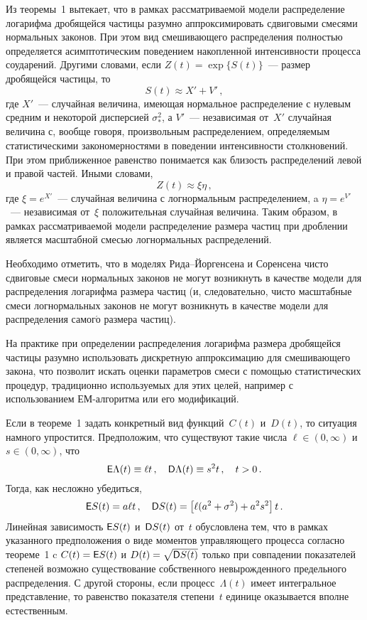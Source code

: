 \begin{multicols}{2}
Из теоремы~1 вытекает, что в рамках рассматриваемой модели
распределение логарифма дробящейся частицы разумно
аппроксимировать сдвиговыми смесями нормальных законов. При этом
вид смешивающего распределения полностью определяется
асимптотическим поведением накопленной интенсивности процесса
соударений. Другими словами, если $Z(t)=\exp\{S(t)\}$~--- размер
дробящейся частицы, то
$$
S(t)\approx X'+V'\,,
$$
где $X'$~--- случайная величина, имеющая нормальное распределение с
нулевым средним и некоторой дисперсией $\sigma_*^2$, а $V'$~---
независимая от~$X'$ случайная величина с, вообще говоря,
произвольным рас\-пределением, определяемым статистическими
за\-ко\-номерностями в поведении интенсивности столкновений. При этом
приближенное\linebreak
 равенство понимается как близость распределений левой
и правой частей. Иными словами,
$$
Z(t)\approx \xi \eta\,,
$$
где $\xi=e^{X'}$~--- случайная величина с логнормальным
распределением, a $\eta=e^{V'}$~--- независимая от~$\xi$
положительная случайная величина. Таким образом, в рамках
рассматриваемой модели распределение размера частиц при дроблении
является масштабной смесью логнормальных распределений.

Необходимо отметить, что в моделях Рида--Йор\-ген\-се\-на и Соренсена
чисто сдвиговые смеси нормальных законов не могут возникнуть в
качестве модели для распределения логарифма размера час\-тиц (и,
следовательно, чисто масштабные смеси
 логнормальных законов не
могут возникнуть в качестве модели для распределения самог{$\acute{\mbox{о}}$}
размера частиц).

На практике при определении распределения логарифма размера
дробящейся частицы разумно использовать дискретную аппроксимацию
для смешивающего закона, что позволит искать оценки параметров
смеси с помощью статистических процедур, традиционно используемых
для этих целей, например с использованием ЕМ-алгоритма или его
модификаций.

Если в теореме~1 задать конкретный вид функций~$C(t)$ и~$D(t)$, то
ситуация намного упростится. Предположим, что существуют такие
числа $\ell\in(0,\infty)$ и $s\in(0,\infty)$, что
$$
{\sf E}\Lambda(t)\equiv \ell t\,,\quad {\sf D}\Lambda(t)\equiv
s^2t\,,\quad t>0\,.
$$
Тогда, как несложно убедиться,
$$
{\sf E}S(t)=a\ell t\,,\quad {\sf
D}S(t)=\left[\ell(a^2+\sigma^2)+a^2s^2\right]t\,.
$$
Линейная зависимость ${\sf E}S(t)$ и~${\sf D}S(t)$ от~$t$
обуслов\-ле\-на тем, что в рамках указанного предположения о виде
моментов управляющего процесса согласно теореме~1 c $C(t)={\sf
E}S(t)$ и $D(t)=\sqrt{{\sf D}S(t)}$ только при совпадении
показателей степеней возможно существование собственного
невырожденного предельного распределения. С другой стороны, если
процесс~$\Lambda(t)$ имеет интегральное представление, то
равенство показателя степени~$t$ единице оказывается вполне
естественным.


\end{multicols}
